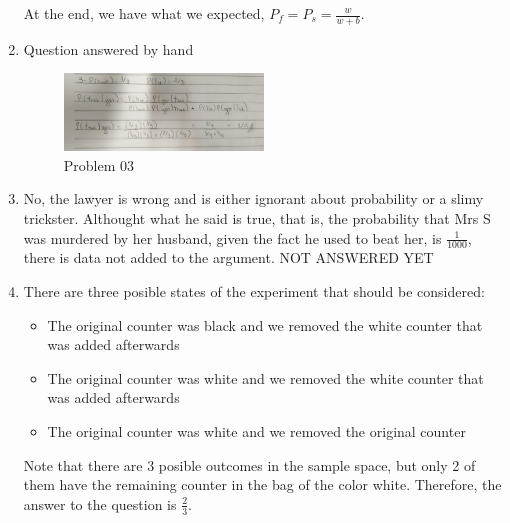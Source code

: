\documentclass{article}
\begin{document}
\begin{enumerate}
    At the end, we have what we expected, \(P_f = P_s = \frac{w}{w + b}\).

    \item Question answered by hand
	\begin{figure}[H]
		\centering
		\includegraphics[width=0.5\textwidth]{images/03.jpeg}
		\caption{Problem 03}
	\end{figure}

\item No, the lawyer is wrong and is either ignorant about probability or a slimy trickster. Althought what he said is true, that is, the probability that Mrs S was murdered by her husband, given the fact he used to beat her, is \(\frac{1}{1000}\), there is data not added to the argument.
NOT ANSWERED YET

\item There are three posible states of the experiment that should be considered:
	\begin{itemize}
		\item The original counter was black and we removed the white counter that was added afterwards
		\item The original counter was white and we removed the white counter that was added afterwards
		\item The original counter was white and we removed the original counter
	\end{itemize}
		Note that there are 3 posible outcomes in the sample space, but only 2 of them have the remaining counter in the bag of the color white. Therefore, the answer to the question is \(\frac{2}{3}\).
\end{enumerate}
\end{document}
